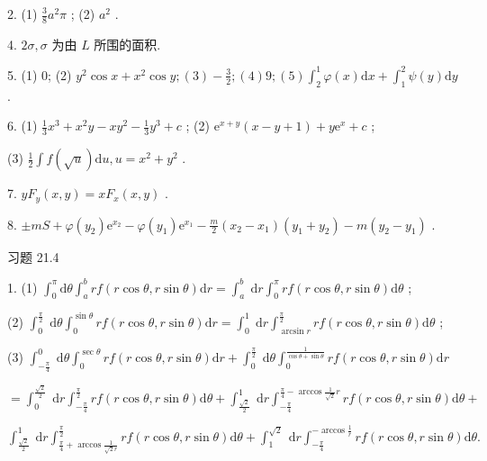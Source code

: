 2. (1) \(\frac{3}{8}{a}^{2}\pi\) ; (2) \({a}^{2}\) .

4. \({2\sigma },\sigma\) 为由 \(L\) 所围的面积.

5. (1) 0; (2) \({y}^{2}\cos x + {x}^{2}\cos y;\left( 3\right)  - \frac{3}{2};\left( 4\right) 9;\left( 5\right) {\int }_{2}^{1}\varphi \left( x\right) \mathrm{d}x + {\int }_{1}^{2}\psi \left( y\right) \mathrm{d}y\) .

6. (1) \(\frac{1}{3}{x}^{3} + {x}^{2}y - x{y}^{2} - \frac{1}{3}{y}^{3} + c\) ; (2) \({\mathrm{e}}^{x + y}\left( {x - y + 1}\right)  + y{\mathrm{e}}^{x} + c\) ;

(3) \(\frac{1}{2}\int f\left( \sqrt{u}\right) \mathrm{d}u,u = {x}^{2} + {y}^{2}\) .

7. \(y{F}_{y}\left( {x,y}\right)  = x{F}_{x}\left( {x,y}\right)\) .

8. \(\pm  {mS} + \varphi \left( {y}_{2}\right) {\mathrm{e}}^{{x}_{2}} - \varphi \left( {y}_{1}\right) {\mathrm{e}}^{{x}_{1}} - \frac{m}{2}\left( {{x}_{2} - {x}_{1}}\right) \left( {{y}_{1} + {y}_{2}}\right)  - m\left( {{y}_{2} - {y}_{1}}\right)\) .

习题 21.4

1. (1) \({\int }_{0}^{\pi }\mathrm{d}\theta {\int }_{a}^{b}{rf}\left( {r\cos \theta ,r\sin \theta }\right) \mathrm{d}r = {\int }_{a}^{b}\mathrm{\;d}r{\int }_{0}^{\pi }{rf}\left( {r\cos \theta ,r\sin \theta }\right) \mathrm{d}\theta\) ;

(2) \({\int }_{0}^{\frac{\pi }{2}}\mathrm{\;d}\theta {\int }_{0}^{\sin \theta }{rf}\left( {r\cos \theta ,r\sin \theta }\right) \mathrm{d}r = {\int }_{0}^{1}\mathrm{\;d}r{\int }_{\arcsin r}^{\frac{\pi }{2}}{rf}\left( {r\cos \theta ,r\sin \theta }\right) \mathrm{d}\theta\) ;

(3) \({\int }_{-\frac{\pi }{4}}^{0}\mathrm{\;d}\theta {\int }_{0}^{\sec \theta }{rf}\left( {r\cos \theta ,r\sin \theta }\right) \mathrm{d}r + {\int }_{0}^{\frac{\pi }{2}}\mathrm{\;d}\theta {\int }_{0}^{\frac{1}{\cos \theta  + \sin \theta }}{rf}\left( {r\cos \theta ,r\sin \theta }\right) \mathrm{d}r\)

\(= {\int }_{0}^{\frac{\sqrt{2}}{2}}\mathrm{\;d}r{\int }_{-\frac{\pi }{4}}^{\frac{\pi }{2}}{rf}\left( {r\cos \theta ,r\sin \theta }\right) \mathrm{d}\theta  + {\int }_{\frac{\sqrt{2}}{2}}^{1}\mathrm{\;d}r{\int }_{-\frac{\pi }{4}}^{\frac{\pi }{4} - \arccos \frac{1}{\sqrt{2}}r}{rf}\left( {r\cos \theta ,r\sin \theta }\right) \mathrm{d}\theta  +\)

\({\int }_{\frac{\sqrt{2}}{2}}^{1}\mathrm{\;d}r{\int }_{\frac{\pi }{4} + \arccos \frac{1}{\sqrt{2}r}}^{\frac{\pi }{2}}{rf}\left( {r\cos \theta ,r\sin \theta }\right) \mathrm{d}\theta  + {\int }_{1}^{\sqrt{2}}\mathrm{\;d}r{\int }_{-\frac{\pi }{4}}^{-\arccos \frac{1}{r}}{rf}\left( {r\cos \theta ,r\sin \theta }\right) \mathrm{d}\theta .\)

